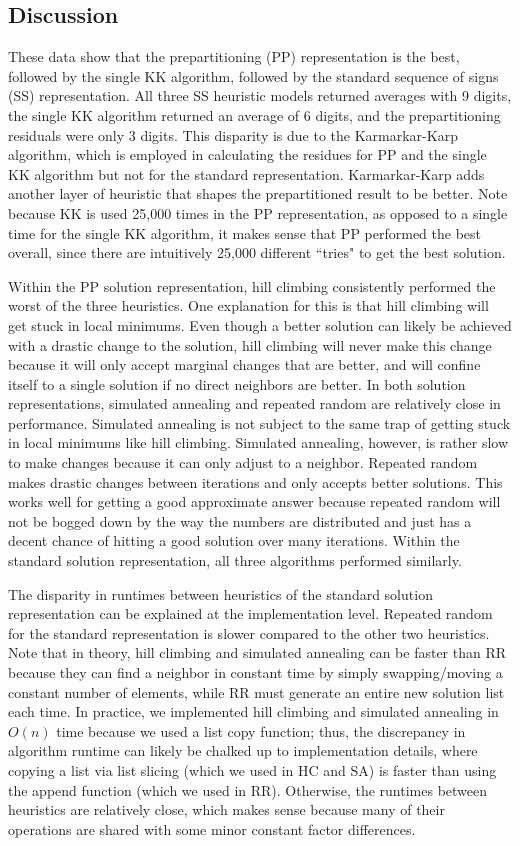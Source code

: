 \documentclass[a4paper]{article}
\begin{document}
	\subsection{Discussion}
	These data show that the prepartitioning (PP) representation is the best, followed by the single KK algorithm, followed by the standard sequence of signs (SS) representation. All three SS heuristic models returned averages with 9 digits, the single KK algorithm returned an average of 6 digits, and the prepartitioning residuals were only 3 digits. This disparity is due to the Karmarkar-Karp algorithm, which is employed in calculating the residues for PP and the single KK algorithm but not for the standard representation. Karmarkar-Karp adds another layer of heuristic that shapes the prepartitioned result to be better. Note because KK is used 25,000 times in the PP representation, as opposed to a single time for the single KK algorithm, it makes sense that PP performed the best overall, since there are intuitively 25,000 different ``tries" to get the best solution.
	
	Within the PP solution representation, hill climbing consistently performed the worst of the three heuristics. One explanation for this is that hill climbing will get stuck in local minimums. Even though a better solution can likely be achieved with a drastic change to the solution, hill climbing will never make this change because it will only accept marginal changes that are better, and will confine itself to a single solution if no direct neighbors are better. In both solution representations, simulated annealing and repeated random are relatively close in performance. Simulated annealing is not subject to the same trap of getting stuck in local minimums like hill climbing. Simulated annealing, however, is rather slow to make changes because it can only adjust to a neighbor. Repeated random makes drastic changes between iterations and only accepts better solutions. This works well for getting a good approximate answer because repeated random will not be bogged down by the way the numbers are distributed and just has a decent chance of hitting a good solution over many iterations. Within the standard solution representation, all three algorithms performed similarly.
	
	The disparity in runtimes between heuristics of the standard solution representation can be explained at the implementation level. Repeated random for the standard representation is slower compared to  the other two heuristics. Note that in theory, hill climbing and simulated annealing can be faster than RR because they can find a neighbor in constant time by simply swapping/moving a constant number of elements, while RR must generate an entire new solution list each time. In practice, we implemented hill climbing and simulated annealing in $O(n)$ time because we used a list copy function; thus, the discrepancy in algorithm runtime can likely be chalked up to implementation details, where copying a list via list slicing (which we used in HC and SA) is faster than using the append function (which we used in RR). Otherwise, the runtimes between heuristics are relatively close, which makes sense because many of their operations are shared with some minor constant factor differences.
	
\end{document}
